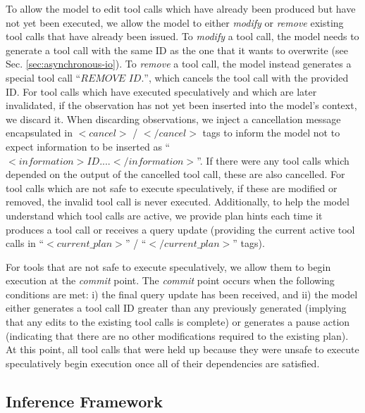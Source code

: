To allow the model to edit tool calls which have already been produced but have not yet been executed, we allow the model to either \textit{modify} or \textit{remove} existing tool calls that have already been issued.
To \textit{modify} a tool call, the model needs to generate a tool call with the same ID as the one that it wants to overwrite (see Sec. \ref{sec:asynchronous-io}).
To \textit{remove} a tool call, the model instead generates a special tool call ``$REMOVE$ $ID.$'', which cancels the tool call with the provided ID.
For tool calls which have executed speculatively and which are later invalidated, if the observation has not yet been inserted into the model's context, we discard it.
When discarding observations, we inject a cancellation message encapsulated in $<cancel>$ / $</cancel>$ tags to inform the model not to expect information to be inserted as
``$<information> ID. ...</information>$''.
If there were any tool calls which depended on the output of the cancelled tool call, these are also cancelled.
For tool calls which are not safe to execute speculatively, if these are modified or removed, the invalid tool call is never executed.
Additionally, to help the model understand which tool calls are active, we provide plan hints each time it produces a tool call or receives a query update (providing the current active tool calls in 
``$<current\_plan>$'' / ``$</current\_plan>$'' tags).

For tools that are not safe to execute speculatively, we allow them to begin execution at the \textit{commit} point.
The \textit{commit} point occurs when the following conditions are met: i) the final query update has been received, and ii) the model either generates a tool call ID greater than any previously generated (implying that any edits to the existing tool calls is complete) or generates a pause action (indicating that there are no other modifications required to the existing plan).
At this point, all tool calls that were held up because they were unsafe to execute speculatively begin execution once all of their dependencies are satisfied.

\subsection{Inference Framework}
\label{sec:inference-framework}

\label{sec:training}

